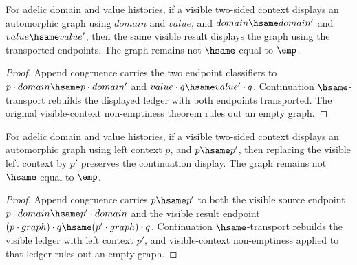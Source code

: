 \begin{theorem}
\label{thm:automorphic-adele-graph-visible-context-endpoint-hsame-transport}
For adelic domain and value histories, if a visible two-sided context displays
an automorphic graph using $domain$ and $value$, and
$domain\hsame domain'$ and $value\hsame value'$, then the same visible
result displays the graph using the transported endpoints. The graph remains
not $\hsame$-equal to $\emp$.
\end{theorem}
\begin{proof}
Append congruence carries the two endpoint classifiers to
$p\cdot domain\hsame p\cdot domain'$ and
$value\cdot q\hsame value'\cdot q$. Continuation $\hsame$-transport
rebuilds the displayed ledger with both endpoints transported. The original
visible-context non-emptiness theorem rules out an empty graph.
\end{proof}

\begin{theorem}
\label{thm:automorphic-adele-graph-visible-context-left-hsame-transport}
For adelic domain and value histories, if a visible two-sided context displays
an automorphic graph using left context $p$, and $p\hsame p'$, then replacing
the visible left context by $p'$ preserves the continuation display. The graph
remains not $\hsame$-equal to $\emp$.
\end{theorem}
\begin{proof}
Append congruence carries $p\hsame p'$ to both the visible source endpoint
$p\cdot domain\hsame p'\cdot domain$ and the visible result endpoint
$(p\cdot graph)\cdot q\hsame (p'\cdot graph)\cdot q$. Continuation
$\hsame$-transport rebuilds the visible ledger with left context $p'$, and
visible-context non-emptiness applied to that ledger rules out an empty graph.
\end{proof}

